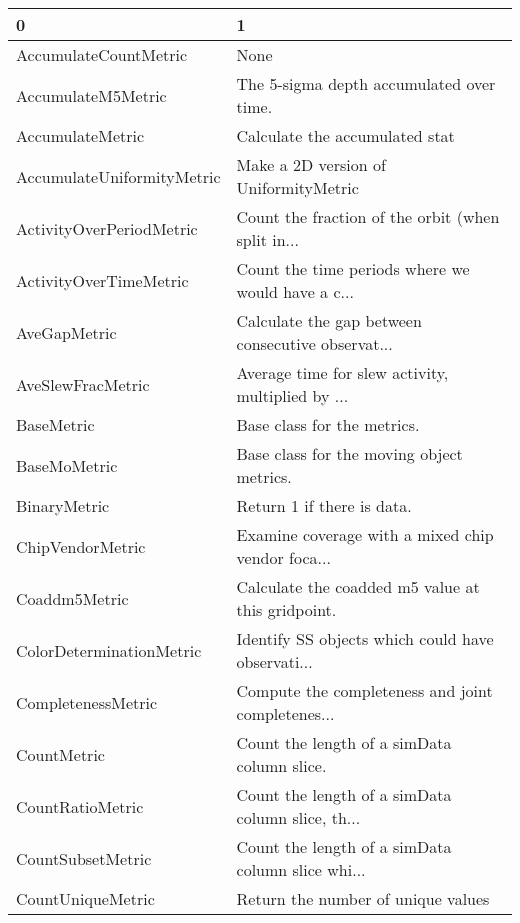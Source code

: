 \begin{tabular}{ll}
\toprule
                             0 &                                                  1 \\
\midrule
         AccumulateCountMetric &                                               None \\
            AccumulateM5Metric &           The 5-sigma depth accumulated over time. \\
              AccumulateMetric &                     Calculate the accumulated stat \\
    AccumulateUniformityMetric &              Make a 2D version of UniformityMetric \\
      ActivityOverPeriodMetric &  Count the fraction of the orbit (when split in... \\
        ActivityOverTimeMetric &  Count the time periods where we would have a c... \\
                  AveGapMetric &  Calculate the gap between consecutive observat... \\
             AveSlewFracMetric &  Average time for slew activity, multiplied by ... \\
                    BaseMetric &                        Base class for the metrics. \\
                  BaseMoMetric &          Base class for the moving object metrics. \\
                  BinaryMetric &                         Return 1 if there is data. \\
              ChipVendorMetric &  Examine coverage with a mixed chip vendor foca... \\
                 Coaddm5Metric &  Calculate the coadded m5 value at this gridpoint. \\
      ColorDeterminationMetric &  Identify SS objects which could have observati... \\
            CompletenessMetric &  Compute the completeness and joint completenes... \\
                   CountMetric &        Count the length of a simData column slice. \\
              CountRatioMetric &  Count the length of a simData column slice, th... \\
             CountSubsetMetric &  Count the length of a simData column slice whi... \\
             CountUniqueMetric &                 Return the number of unique values \\

\end{tabular}
